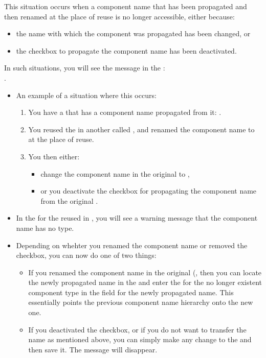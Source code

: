 This situation occurs when a component name that has been propagated and then renamed at the place of reuse is no longer accessible, either because:

\begin{itemize}
\item the name with which the component was propagated has been changed, or
\item the checkbox to propagate the component name has been deactivated.
\end{itemize}
In such situations, you will see the message in the \gdcompnamesview{} :\\
.


\begin{itemize}
\item An example of a situation where this occurs:
\begin{enumerate}
\item You have a \gdcase{}  that has a component name propagated from it:  .
\item You reused the  \gdcase{} in another \gdcase{} called , and renamed the component name to  at the place of reuse.
\item You then either:\\
\begin{itemize}
\item change the component name in the original \gdcase{} to , 
\item or you deactivate the checkbox for propagating the component name from the original \gdcase{}.
\end{itemize}
\end{enumerate}
\item In the \gdcompnamesview{} for the reused \gdcase{} in , you will see a warning message that the component name has no type. 
\item Depending on whehter you renamed the component name or removed the checkbox, you can now do one of two things:
\begin{itemize}
\item If you renamed the component name in the original \gdcase{} (, then you can locate the newly propagated name in the \gdcompnamesview{} and enter the  for the no longer existent component type in the  field for the newly propagated name. This essentially points the previous component name hierarchy onto the new one.
\item If you deactivated the checkbox, or if you do not want to transfer the name as mentioned above, you can simply make any change to the \gdcase{} and then save it. The message will disappear.
\end{itemize}
\end{itemize}
